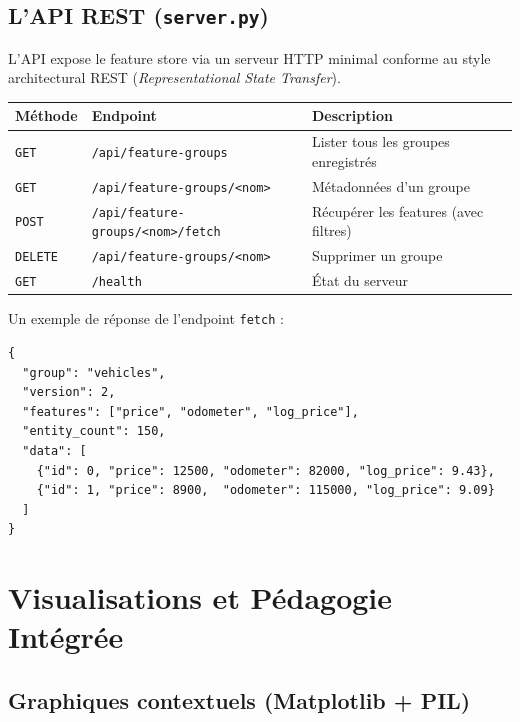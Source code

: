 \documentclass[12pt,a4paper]{article}
\begin{document}
\subsection{L'API REST (\texttt{server.py})}

L'API expose le feature store via un serveur HTTP minimal conforme au style
architectural REST (\textit{Representational State Transfer}).

\begin{center}
\renewcommand{\arraystretch}{1.4}
\begin{tabular}{llp{6cm}}
  \toprule
  \textbf{Méthode} & \textbf{Endpoint} & \textbf{Description} \\
  \midrule
  \texttt{GET}    & \texttt{/api/feature-groups}
                  & Lister tous les groupes enregistrés \\
  \texttt{GET}    & \texttt{/api/feature-groups/<nom>}
                  & Métadonnées d'un groupe \\
  \texttt{POST}   & \texttt{/api/feature-groups/<nom>/fetch}
                  & Récupérer les features (avec filtres) \\
  \texttt{DELETE} & \texttt{/api/feature-groups/<nom>}
                  & Supprimer un groupe \\
  \texttt{GET}    & \texttt{/health}
                  & État du serveur \\
  \bottomrule
\end{tabular}
\end{center}

Un exemple de réponse de l'endpoint \texttt{fetch} :

\begin{lstlisting}[language={},caption={Réponse JSON de /api/feature-groups/vehicles/fetch}]
{
  "group": "vehicles",
  "version": 2,
  "features": ["price", "odometer", "log_price"],
  "entity_count": 150,
  "data": [
    {"id": 0, "price": 12500, "odometer": 82000, "log_price": 9.43},
    {"id": 1, "price": 8900,  "odometer": 115000, "log_price": 9.09}
  ]
}
\end{lstlisting}

\section{Visualisations et Pédagogie Intégrée}

\subsection{Graphiques contextuels (Matplotlib + PIL)}
\end{document}
